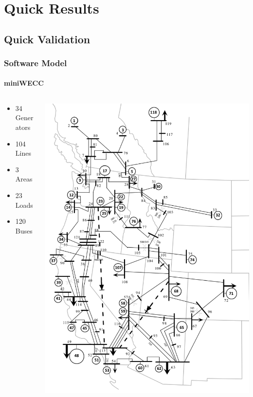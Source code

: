 \documentclass[14pt, unknownkeysallowed]{beamer}
\begin{document}
\section{Quick Results}
\subsection{Quick Validation}
\begin{frame}
\frametitle{Software Model}
\framesubtitle{miniWECC}
\begin{columns}
	\begin{column}{0.45\textwidth}
		\begin{itemize}
			\item 34 Generators
			\item 104 Lines
			\item 3 Areas
			\item 23 Loads
			\item 120 Buses
		\end{itemize}
	\end{column}
	\begin{column}{.5\textwidth}
		\includegraphics[height=.8\textheight]{miniWECCpres} 
		{\tiny\cite{RJminiWECC}}%
	\end{column}
\end{columns}
\end{frame}
\end{document}
